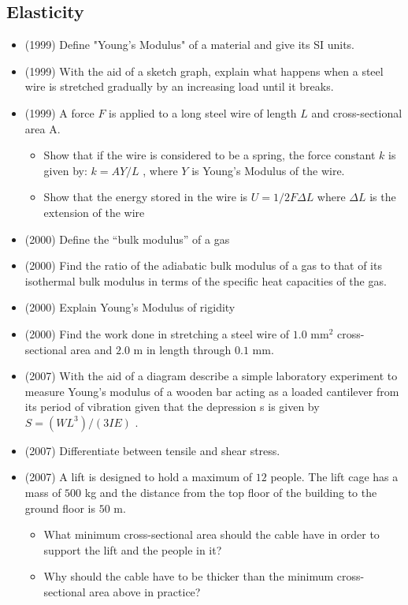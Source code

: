 \documentclass{article}
\begin{document}
\subsection{Elasticity}
\begin{itemize}
\item (1999)  Define "Young's Modulus" of a material and give its SI units.
\item (1999)  With the aid of a sketch graph, explain what happens when a steel wire is stretched gradually by an increasing load until it breaks. 
\item (1999)  A force $ F$ is applied to a long steel wire of length $ L$ and cross-sectional area A.
 \begin{itemize}
\item Show that if the wire is considered to be a spring, the force constant $ k$ is given by: $ k= AY/L$ , where $ Y$ is Young's Modulus of the wire.
\item Show that the energy stored in the wire is $ U=1/2F \Delta L$ where $ \Delta{L}$ is the extension of the wire
\end{itemize}
\item (2000)  Define the “bulk modulus” of a gas
\item (2000)  Find the ratio of the adiabatic bulk modulus of a gas to that of its isothermal bulk modulus in terms of the specific heat capacities of the gas.
\item (2000)  Explain Young’s Modulus of rigidity
\item (2000)  Find the work done in stretching a steel wire of $ 1.0$ mm$ ^{2}$ cross-sectional area and $ 2.0$ m in length through $ 0.1$ mm.
\item (2007)  With the aid of a diagram describe a simple laboratory experiment to measure Young’s modulus of a wooden bar acting as a loaded cantilever from its period of vibration given that the depression s is given by $ S=(WL^{3})/(3IE)$ . 
\item (2007)  Differentiate between tensile and shear stress. 
\item (2007)  A lift is designed to hold a maximum of $ 12$ people. The lift cage has a mass of $ 500$ kg and the distance from the top floor of the building to the ground floor is $ 50$ m.
 \begin{itemize}
\item What minimum cross-sectional area should the cable have in order to support the lift and the people in it?
\item Why should the cable have to be thicker than the minimum cross-sectional area above in practice? 

\end{itemize}
\end{itemize}
\end{document}

